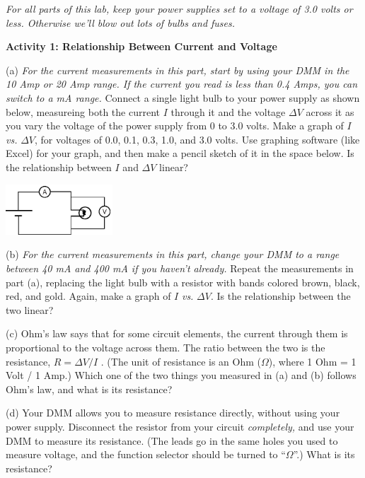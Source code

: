 \begin{newboxed}
\textit{For all parts of this lab, keep your power supplies set to a voltage of 3.0 volts or less.  Otherwise we'll blow out lots of bulbs and fuses.}
\end{newboxed}

\vspace{0.1 in}
\textbf{Activity 1: Relationship Between Current and Voltage}

(a) \textit{For the current measurements in this part, start by using your DMM in the 10 Amp or 20 Amp range.  If the current you read is less than 0.4 Amps, you can switch to a mA range.} Connect a single light bulb to your power supply as shown below, measureing both the current $I$ through it and the voltage $\Delta V$ across it as you vary the voltage of the power supply from 0 to 3.0 volts.  Make a graph of $I$ \textit{vs.} $\Delta V$, for voltages of 0.0, 0.1, 0.3, 1.0, and 3.0 volts.  Use graphing software (like Excel) for your graph, and then make a pencil sketch of it in the space below.  Is the relationship between $I$ and $\Delta V$ linear?

\hspace{0.5in}\includegraphics[width=0.3\textwidth]{electric_circuits2/circ_diag1.eps}
\answerspace{0.5 in}

(b) \textit{For the current measurements in this part, change your DMM to a range between 40 mA and 400 mA if you haven't already.} Repeat the measurements in part (a), replacing the light bulb with a resistor with bands colored brown, black, red, and gold.  Again, make a graph of $I$ \textit{vs.} $\Delta V$.  Is the relationship between the two linear?
\answerspace{1 in}

\newpage
(c) Ohm's law says that for some circuit elements, the current through them is proportional to the voltage across them.  The ratio between the two is the resistance, $R=\Delta V / I$ .  (The unit of resistance is an Ohm ($\Omega$), where 1 Ohm = 1 Volt / 1 Amp.)  Which one of the two things you measured in (a) and (b) follows Ohm's law, and what is its resistance?
\answerspace{0.7 in}

(d) Your DMM allows you to measure resistance directly, without using your power supply.  Disconnect the resistor from your circuit \textit{completely,} and use your DMM to measure its resistance.  (The leads go in the same holes you used to measure voltage, and the function selector should be turned to ``$\Omega$''.)  What is its resistance?
\answerspace{0.5 in}


